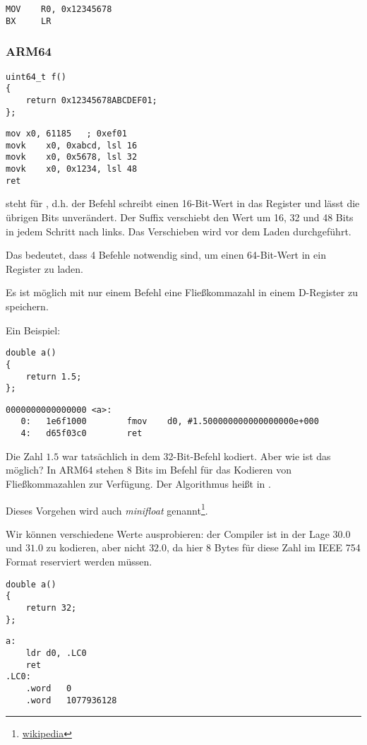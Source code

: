 \begin{lstlisting}[style=customasmARM]
MOV    R0, 0x12345678
BX     LR
\end{lstlisting}

\subsubsection{ARM64}

\begin{lstlisting}[style=customc]
uint64_t f()
{
	return 0x12345678ABCDEF01;
};
\end{lstlisting}

\begin{lstlisting}[caption=GCC 4.9.1 -O3,style=customasmARM]
mov	x0, 61185   ; 0xef01
movk	x0, 0xabcd, lsl 16
movk	x0, 0x5678, lsl 32
movk	x0, 0x1234, lsl 48
ret
\end{lstlisting}

 steht für , d.h. der Befehl schreibt einen 16-Bit-Wert in das Register und lässt die übrigen Bits
unverändert.
Der Suffix  verschiebt den Wert um 16, 32 und 48 Bits in jedem Schritt nach links. Das Verschieben wird vor dem
Laden durchgeführt.

Das bedeutet, dass 4 Befehle notwendig sind, um einen 64-Bit-Wert in ein Register zu laden.

Es ist möglich mit nur einem Befehl eine Fließkommazahl in einem D-Register zu speichern.

Ein Beispiel:

\begin{lstlisting}[style=customc]
double a()
{
	return 1.5;
};
\end{lstlisting}

\begin{lstlisting}[caption=GCC 4.9.1 -O3 + objdump,style=customasmARM]
0000000000000000 <a>:
   0:   1e6f1000        fmov    d0, #1.500000000000000000e+000
   4:   d65f03c0        ret
\end{lstlisting}
Die Zahl $1.5$ war tatsächlich in dem 32-Bit-Befehl kodiert. Aber wie ist das möglich?
In ARM64 stehen 8 Bits im  Befehl für das Kodieren von Fließkommazahlen zur Verfügung.
Der Algorithmus heißt  in \ARMSixFourRefURL. 


Dieses Vorgehen wird auch \emph{minifloat} genannt\footnote{\href{http://go.yurichev.com/17139}{wikipedia}}.

Wir können verschiedene Werte ausprobieren: der Compiler ist in der Lage $30.0$ und $31.0$ zu kodieren, aber nicht
$32.0$, da hier 8 Bytes für diese Zahl im IEEE 754 Format reserviert werden müssen.

\begin{lstlisting}[style=customc]
double a()
{
	return 32;
};
\end{lstlisting}

\begin{lstlisting}[caption=GCC 4.9.1 -O3,style=customasmARM]
a:
	ldr	d0, .LC0
	ret
.LC0:
	.word	0
	.word	1077936128
\end{lstlisting}
